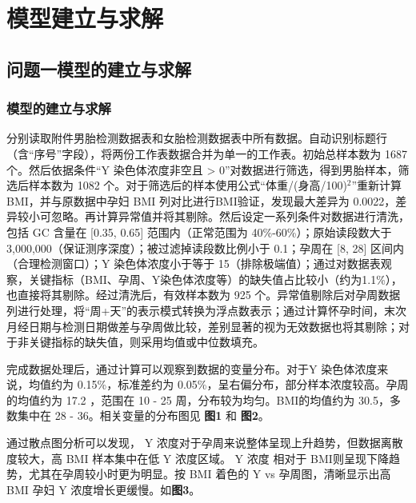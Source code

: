 \documentclass[withoutpreface,bwprint]{cumcmthesis} %
\begin{document}
\section{模型建立与求解}
\subsection{问题一模型的建立与求解}
\subsubsection{模型的建立与求解}
分别读取附件男胎检测数据表和女胎检测数据表中所有数据。自动识别标题行（含“序号”字段），将两份工作表数据合并为单一的工作表。初始总样本数为 1687个。然后依据条件“Y 染色体浓度非空且 > 0”对数据进行筛选，得到男胎样本，筛选后样本数为 1082 个。对于筛选后的样本使用公式“体重/(身高/100)$^2$”重新计算 BMI，并与原数据中孕妇 BMI 列对比进行BMI验证，发现最大差异为 0.0022，差异较小可忽略。再计算异常值并将其剔除。然后设定一系列条件对数据进行清洗，包括 GC 含量在 [0.35, 0.65] 范围内（正常范围为 40\%-60\%）；原始读段数大于 3,000,000（保证测序深度）；被过滤掉读段数比例小于 0.1；孕周在 [8, 28] 区间内（合理检测窗口）；Y 染色体浓度小于等于 15（排除极端值）；通过对数据表观察，关键指标（BMI、孕周、Y染色体浓度等）的缺失值占比较小（约为1.1\%），也直接将其剔除。经过清洗后，有效样本数为 925 个。异常值剔除后对孕周数据列进行处理，将“周+天”的表示模式转换为浮点数表示；通过计算怀孕时间，末次月经日期与检测日期做差与孕周做比较，差别显著的视为无效数据也将其剔除；对于非关键指标的缺失值，则采用均值或中位数填充。

完成数据处理后，通过计算可以观察到数据的变量分布。对于Y 染色体浓度来说，均值约为 0.15\%，标准差约为 0.05\%，呈右偏分布，部分样本浓度较高。孕周的均值约为 17.2 ，范围在 10 - 25 周，分布较为均匀。BMI的均值约为 30.5，多数集中在 28 - 36。相关变量的分布图见 \textbf{图1} 和 \textbf{图2}。


通过散点图分析可以发现， Y 浓度对于孕周来说整体呈现上升趋势，但数据离散度较大，高 BMI 样本集中在低 Y 浓度区域。 Y 浓度 相对于 BMI则呈现下降趋势，尤其在孕周较小时更为明显。按 BMI 着色的 Y vs 孕周图，清晰显示出高 BMI 孕妇 Y 浓度增长更缓慢。如\textbf{图3}。
\end{document}
